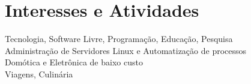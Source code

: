 \documentclass[a4paper,10pt]{article}
\begin{document}
\section{Interesses e Atividades}
Tecnologia, Software Livre, Programação, Educação, Pesquisa \\
Administração de Servidores Linux e Automatização de processos \\
Domótica e Eletrônica de baixo custo \\
Viagens, Culinária

\vfill
\hrulefill\\
\center{\footnotesize{\today}}
\end{document}
